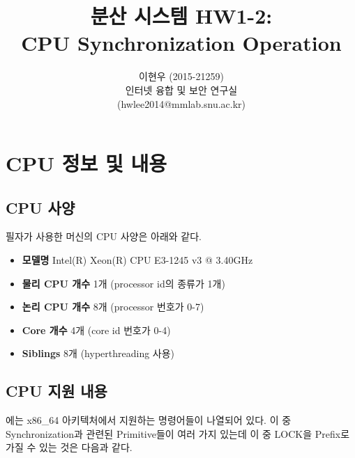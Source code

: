 \documentclass[11pt, a4paper]{article}
\begin{document}
 

\title{분산 시스템 HW1-2: \\CPU Synchronization Operation}
\author{이현우 (2015-21259) \\ 인터넷 융합 및 보안 연구실 \\ (hwlee2014@mmlab.snu.ac.kr)}
\maketitle

\section{CPU 정보 및 내용}

\subsection{CPU 사양}
필자가 사용한 머신의 CPU 사양은 아래와 같다.

\begin{itemize}
	\item \textbf{모델명} Intel(R) Xeon(R) CPU E3-1245 v3 @ 3.40GHz
	\item \textbf{물리 CPU 개수} 1개 (processor id의 종류가 1개)
	\item \textbf{논리 CPU 개수} 8개 (processor 번호가 0-7)
	\item \textbf{Core 개수} 4개 (core id 번호가 0-4)
	\item \textbf{Siblings} 8개 (hyperthreading 사용)
\end{itemize}

\subsection{CPU 지원 내용}
\cite{guide2011intel}에는 x86\_64 아키텍처에서 지원하는 명령어들이 나열되어 있다. 이 중 Synchronization과 관련된 Primitive들이 여러 가지 있는데 이 중 LOCK을 Prefix로 가질 수 있는 것은 다음과 같다.
\end{document}
